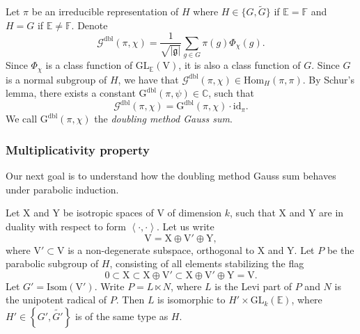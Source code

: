 \documentclass[12pt, reqno]{amsart}
\theoremstyle{definition}
\theoremstyle{definition}
\theoremstyle{definition}
\newcommand{\cComplex}{\mathbb{C}}
\newcommand{\Hom}{\mathrm{Hom}}
\newcommand{\idmap}{\mathrm{id}}
\newcommand{\sizeof}[1]{\left|#1\right|}
\newcommand{\hermitianSpace}{\mathrm{V}}
\newcommand{\xIsotropic}{\mathrm{X}}
\newcommand{\yIsotropic}{\mathrm{Y}}
\newcommand{\innerproduct}[2]{\left\langle #1,#2\right\rangle}
\newcommand{\fieldCharacter}{\psi}
\newcommand{\GL}{\mathrm{GL}}
\newcommand{\GroupExtension}[1]{\widetilde{#1}}
\newcommand{\finiteField}{\mathbb{F}}
\newcommand{\quadraticExtension}{\mathbb{E}}
\newcommand{\dblGaussSum}[2]{\mathcal{G}^{\mathrm{dbl}}\left(#1, #2\right)}
\newcommand{\dblGaussSumScalar}[2]{\mathrm{G}^{\mathrm{dbl}}\left(#1, #2\right)}
\newcommand{\IsometryGroup}{\mathrm{Isom}}
\newcommand{\lieAlgebra}{\mathfrak{g}}
\begin{document}
Let $\pi$ be an irreducible representation of $H$ where $H \in \{G, \GroupExtension{G}\}$ if $\quadraticExtension = \finiteField$ and $H = G$ if $\quadraticExtension \ne \finiteField$. Denote $$\dblGaussSum{\pi}{\chi} = \frac{1}{\sqrt{\sizeof{\lieAlgebra}}} \sum_{g \in G} \pi\left(g\right) \Phi_{\chi}\left(g\right).$$
Since $\Phi_{\chi}$ is a class function of $\GL_{\quadraticExtension}\left(\hermitianSpace\right)$, it is also a class function of $G$. Since $G$ is a normal subgroup of $H$, we have that $\dblGaussSum{\pi}{\chi} \in \Hom_{H}\left(\pi, \pi\right)$. By Schur's lemma, there exists a constant $\dblGaussSumScalar{\pi}{\fieldCharacter} \in \cComplex$, such that $$\dblGaussSum{\pi}{\chi} = \dblGaussSumScalar{\pi}{\chi} \cdot \idmap_\pi.$$
We call $\dblGaussSumScalar{\pi}{\chi}$ the \emph{doubling method Gauss sum}.

\subsubsection{Multiplicativity property}
Our next goal is to understand how the doubling method Gauss sum behaves under parabolic induction.

Let $\xIsotropic$ and $\yIsotropic$ be isotropic spaces of $\hermitianSpace$ of dimension $k$, such that $\xIsotropic$ and $\yIsotropic$ are in duality with respect to form $\innerproduct{\cdot}{\cdot}$. Let us write $$\hermitianSpace = \xIsotropic \oplus \hermitianSpace' \oplus \yIsotropic,$$
where $\hermitianSpace' \subset \hermitianSpace$ is a non-degenerate subspace, orthogonal to $\xIsotropic$ and $\yIsotropic$. Let $P$ be the parabolic subgroup of $H$, consisting of all elements stabilizing the flag $$0 \subset \xIsotropic \subset \xIsotropic \oplus \hermitianSpace' \subset \xIsotropic \oplus \hermitianSpace' \oplus \yIsotropic = \hermitianSpace.$$
Let $G' = \IsometryGroup\left(\hermitianSpace'\right)$. Write $P = L \ltimes N$, where $L$ is the Levi part of $P$ and $N$ is the unipotent radical of $P$. Then $L$ is isomorphic to $H' \times \GL_k\left(\quadraticExtension\right)$, where $H' \in \left\{G',\GroupExtension{G'}\right\}$ is of the same type as $H$. 
\end{document}
